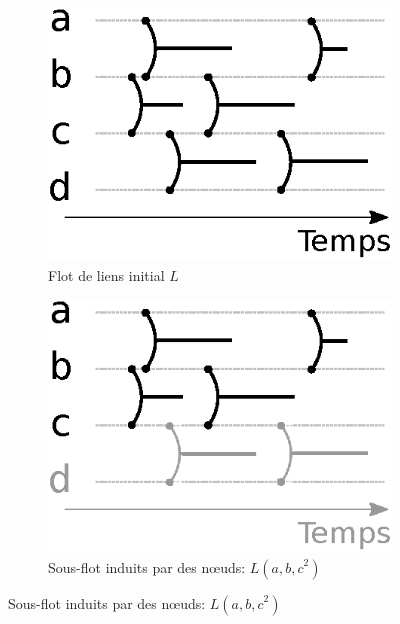 \begin{figure}[]
\centering
	\begin{subfigure}{0.2\linewidth}
		\includegraphics[width=\linewidth]{img/Intro/sous_flots.eps}\hfill
		\caption{Flot de liens initial $L$}
		\label{fig:exemple_sous_flot_init}	
	\end{subfigure}\hspace{0.1\linewidth}
	\begin{subfigure}{0.2\linewidth}
		\includegraphics[width=\linewidth]{img/Intro/sous_flots1.eps}\hfill
		\caption{Sous-flot induits par des n\oe uds: $L({a,b,c}^2)$}	
		\label{fig:exemple_sous_flot1}	
	\end{subfigure}\hspace{0.1\linewidth}

\end{figure}

